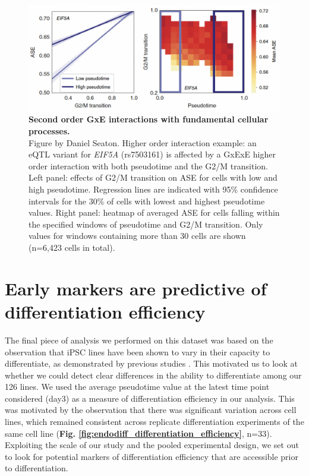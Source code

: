 \begin{figure}[h]
\centering
\includegraphics[width=15.5cm]{Chapter4/Fig/endodiff_GxExE.png}
\caption[Second order GxE interactions with fundamental cellular processes]{\textbf{Second order GxE interactions with fundamental cellular processes.}\\
Figure by Daniel Seaton.
Higher order interaction example: an eQTL variant for \textit{EIF5A} (rs7503161) is affected by a GxExE higher order interaction with both pseudotime and the G2/M transition. 
Left panel: effects of G2/M transition on ASE for cells with low and high pseudotime. 
Regression lines are indicated with 95\% confidence intervals for the 30\% of cells with lowest and highest pseudotime values. 
Right panel: heatmap of averaged ASE for cells falling within the specified windows of pseudotime and G2/M transition. 
Only values for windows containing more than 30 cells are shown (n=6,423 cells in total).}
\label{fig:endodiff_gxexe}
\end{figure}

\newpage

\section{Early markers are predictive of differentiation efficiency}
\label{sec:endodiff_differentiation_efficiency}

The final piece of analysis we performed on this dataset was based on the observation that iPSC lines have been shown to vary in their capacity to differentiate, as demonstrated by previous studies \cite{bock2011reference}.
This motivated us to look at whether we could detect clear differences in the ability to differentiate among our 126 lines.
We used the average pseudotime value at the latest time point considered (day3) as a measure of differentiation efficiency in our analysis.
This was motivated by the observation that there was significant variation across cell lines, which remained consistent across replicate differentiation experiments of the same cell line (\textbf{Fig. \ref{fig:endodiff_differentiation_efficiency}}, n=33).
Exploiting the scale of our study and the pooled experimental design, we set out to look for potential markers of differentiation efficiency that are accessible prior to differentiation.

